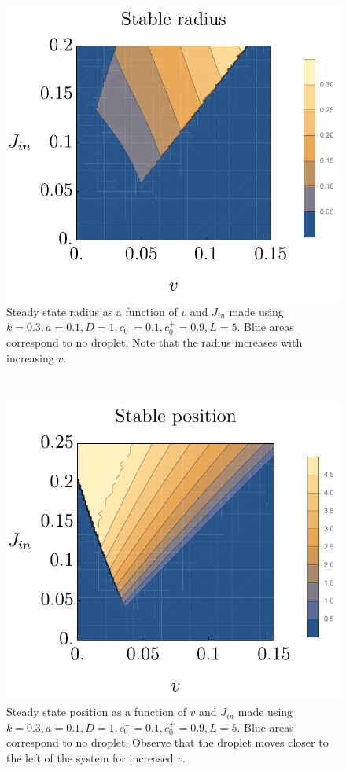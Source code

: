 \documentclass{Dissertate}
\let\origfigure\figure
\let\endorigfigure\endfigure
\renewenvironment{figure}[1][2] {
    \expandafter\origfigure\expandafter[H]
} {
    \endorigfigure
}
\begin{document}
\begin{figure}[h!]
    \centering
    \begin{subfigure}[t]{0.5\textwidth}
        \centering
        \includegraphics{source/figures/pdf/Rstable.pdf}
        \caption{Steady state radius as a function of \(v\) and \(J_{in}\) made
using \(k=0.3, a=0.1, D=1 ,c_0^-=0.1,c_0^+=0.9, L=5\). Blue areas
correspond to no droplet. Note that the radius increases with increasing $v$.\label{fig:rstabledecay}}
    \end{subfigure}%
    ~ 
    \begin{subfigure}[t]{0.5\textwidth}
        \centering
        \includegraphics{source/figures/pdf/Xstable.pdf}
        \caption{Steady state position as a function of \(v\) and \(J_{in}\)
made using \(k=0.3, a=0.1, D=1 ,c_0^-=0.1,c_0^+=0.9, L=5\). Blue areas
correspond to no droplet. Observe that the droplet moves closer to the left of the system for increased $v$.\label{fig:xstabledecay}}
    \end{subfigure}
    \caption{}
\end{figure}
\end{document}
